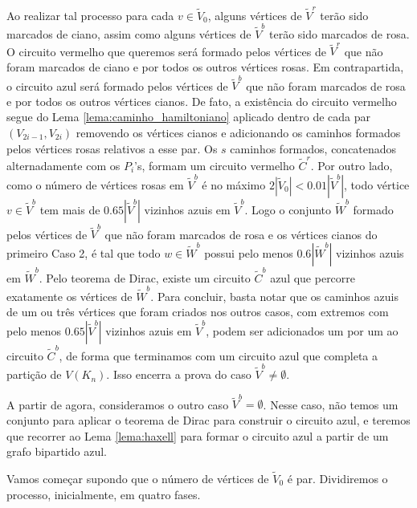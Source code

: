Ao realizar tal processo para cada $v\in \tilde{V}_0$, alguns vértices de $\tilde{V}^r$ terão sido marcados de ciano, assim como alguns vértices de $\tilde{V}^b$ terão sido marcados de rosa. O circuito vermelho que queremos será formado pelos vértices de $\tilde{V}^r$ que não foram marcados de ciano e por todos os outros vértices rosas. Em contrapartida, o circuito azul será formado pelos vértices de $\tilde{V}^b$ que não foram marcados de rosa e por todos os outros vértices cianos. De fato, a existência do circuito vermelho segue do Lema \ref{lema:caminho_hamiltoniano} aplicado dentro de cada par $(V_{2i-1},V_{2i})$ removendo os vértices cianos e adicionando os caminhos formados pelos vértices rosas relativos a esse par. Os $s$ caminhos formados, concatenados alternadamente com os $P_i$'s, formam um circuito vermelho $\tilde{C}^r$. Por outro lado, como o número de vértices rosas em $\tilde{V}^b$ é no máximo $2|\tilde{V}_0| < 0.01|\tilde{V}^b|$, todo vértice $v\in\tilde{V}^b$ tem mais de $0.65|\tilde{V}^b|$ vizinhos azuis em $\tilde{V}^b$. Logo o conjunto $\tilde{W}^b$ formado pelos vértices de $\tilde{V}^b$ que não foram marcados de rosa e os vértices cianos do primeiro Caso 2, é tal que todo $w\in\tilde{W}^b$ possui pelo menos $0.6|\tilde{W}^b|$ vizinhos azuis em $\tilde{W}^b$. Pelo teorema de Dirac, existe um circuito $\tilde{C}^b$ azul que percorre exatamente os vértices de $\tilde{W}^b$. Para concluir, basta notar que os caminhos azuis de um ou três vértices que foram criados nos outros casos, com extremos com pelo menos $0.65|\tilde{V}^b|$ vizinhos azuis em $\tilde{V}^b$, podem ser adicionados um por um ao circuito $\tilde{C}^b$, de forma que terminamos com um circuito azul que completa a partição de $V(K_n)$. Isso encerra a prova do caso $\tilde{V}^b\neq\emptyset$.

A partir de agora, consideramos o outro caso $\tilde{V}^b = \emptyset$. Nesse caso, não temos um conjunto para aplicar o teorema de Dirac para construir o circuito azul, e teremos que recorrer ao Lema \ref{lema:haxell} para formar o circuito azul a partir de um grafo bipartido azul.

Vamos começar supondo que o número de vértices de $\tilde{V}_0$ é par. Dividiremos o processo, inicialmente, em quatro fases.

